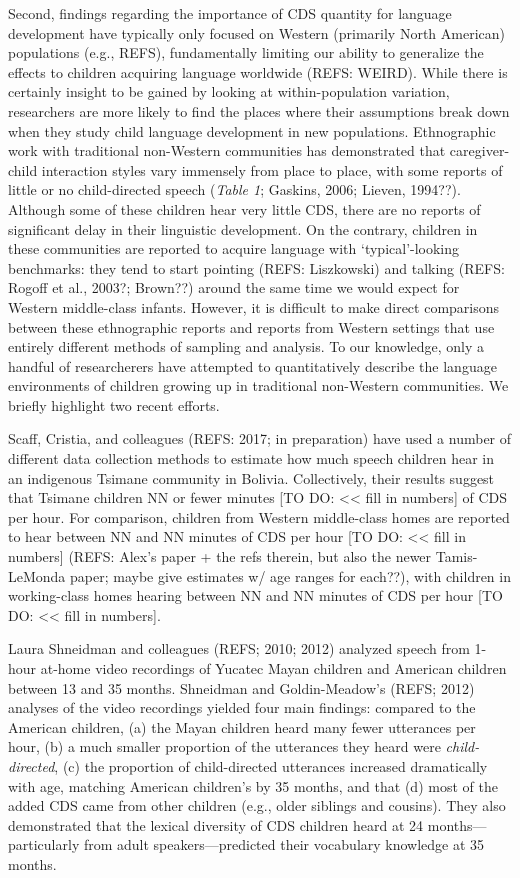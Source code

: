 \documentclass[man]{apa6}
\theoremstyle{definition}
\theoremstyle{definition}
\theoremstyle{definition}
\theoremstyle{remark}
\begin{document}
Second, findings regarding the importance of CDS quantity for language
development have typically only focused on Western (primarily North
American) populations (e.g., REFS), fundamentally limiting our ability
to generalize the effects to children acquiring language worldwide
(REFS: WEIRD). While there is certainly insight to be gained by looking
at within-population variation, researchers are more likely to find the
places where their assumptions break down when they study child language
development in new populations. Ethnographic work with traditional
non-Western communities has demonstrated that caregiver-child
interaction styles vary immensely from place to place, with some reports
of little or no child-directed speech (\emph{Table 1}; Gaskins, 2006;
Lieven, 1994??). Although some of these children hear very little CDS,
there are no reports of significant delay in their linguistic
development. On the contrary, children in these communities are reported
to acquire language with `typical'-looking benchmarks: they tend to
start pointing (REFS: Liszkowski) and talking (REFS: Rogoff et al.,
2003?; Brown??) around the same time we would expect for Western
middle-class infants. However, it is difficult to make direct
comparisons between these ethnographic reports and reports from Western
settings that use entirely different methods of sampling and analysis.
To our knowledge, only a handful of researcherers have attempted to
quantitatively describe the language environments of children growing up
in traditional non-Western communities. We briefly highlight two recent
efforts.

Scaff, Cristia, and colleagues (REFS: 2017; in preparation) have used a
number of different data collection methods to estimate how much speech
children hear in an indigenous Tsimane community in Bolivia.
Collectively, their results suggest that Tsimane children NN or fewer
minutes {[}TO DO: \textless{}\textless{} fill in numbers{]} of CDS per
hour. For comparison, children from Western middle-class homes are
reported to hear between NN and NN minutes of CDS per hour {[}TO DO:
\textless{}\textless{} fill in numbers{]} (REFS: Alex's paper + the refs
therein, but also the newer Tamis-LeMonda paper; maybe give estimates w/
age ranges for each??), with children in working-class homes hearing
between NN and NN minutes of CDS per hour {[}TO DO:
\textless{}\textless{} fill in numbers{]}.

Laura Shneidman and colleagues (REFS; 2010; 2012) analyzed speech from
1-hour at-home video recordings of Yucatec Mayan children and American
children between 13 and 35 months. Shneidman and Goldin-Meadow's (REFS;
2012) analyses of the video recordings yielded four main findings:
compared to the American children, (a) the Mayan children heard many
fewer utterances per hour, (b) a much smaller proportion of the
utterances they heard were \emph{child-directed}, (c) the proportion of
child-directed utterances increased dramatically with age, matching
American children's by 35 months, and that (d) most of the added CDS
came from other children (e.g., older siblings and cousins). They also
demonstrated that the lexical diversity of CDS children heard at 24
months---particularly from adult speakers---predicted their vocabulary
knowledge at 35 months.
\end{document}
